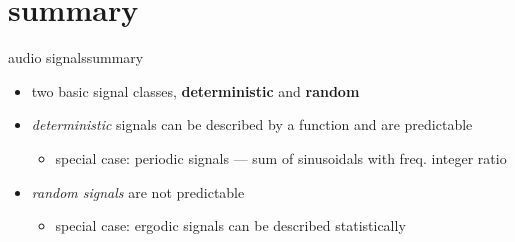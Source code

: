
\section{summary}
    \begin{frame}{audio signals}{summary}
        \begin{itemize}
            \item   two basic signal classes, \textbf{deterministic} and \textbf{random}
            \bigskip
            \item   \textit{deterministic} signals can be described by a function and are predictable
                \begin{itemize}
                    \item   special case: periodic signals --- sum of sinusoidals with freq. integer ratio
                \end{itemize}
            \bigskip
            \item   \textit{random signals} are not predictable
                \begin{itemize}
                    \item   special case: ergodic signals can be described statistically 
                \end{itemize}
        \end{itemize}
    \end{frame}
    


